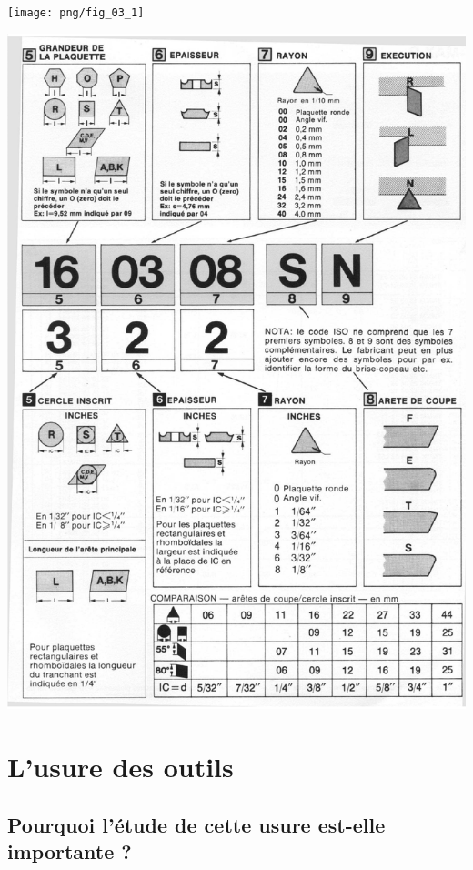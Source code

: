 \documentclass[11pt,oneside]{article}
\begin{document}
\noindent \begin{minipage}[c]{.45\linewidth}
\begin{center}
\texttt{[image: png/fig\_03\_1]}
\end{center}
\end{minipage}\hfill
\begin{minipage}[c]{.45\linewidth}
\begin{center}
\includegraphics[width=\textwidth]{png/fig_03_2}
\end{center}
\end{minipage}

\section{L'usure des outils}

\subsection{Pourquoi l'étude de cette usure est-elle importante ?}
\end{document}
